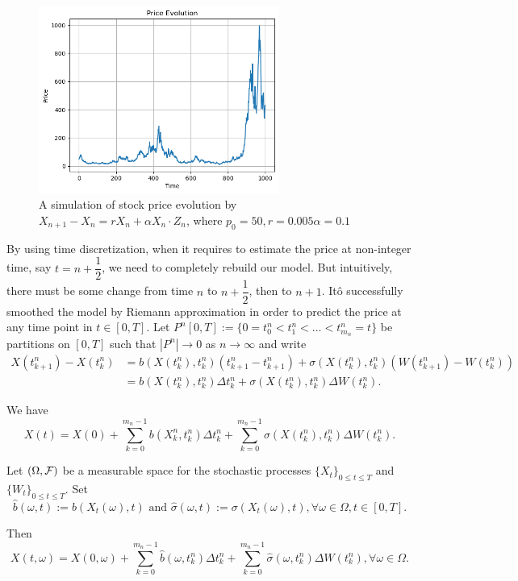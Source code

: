 \begin{figure}
  \centering
  \includegraphics[width=0.7\textwidth]{img/stock-price-sampling.png}
  \vspace{0.25cm}
  \caption[Stock price simulation]{A simulation of stock price evolution by $X_{n+1} - X_n = rX_n + \alpha X_n\cdot Z_{n}$, where $p_0=50, r = 0.005
      \alpha = 0.1$}
\end{figure}

By using time discretization, when it requires to estimate the price at non-integer time, say $t=n+\dfrac{1}{2}$, we need to completely rebuild our model. But intuitively, there must be some change from time $n$ to $n+\dfrac{1}{2}$, then to $n+1$. Itô successfully smoothed the model by Riemann approximation in order to predict the price at any time point in $t\in[0,T]$. Let $P^n[0,T]:=\{0=t^n_0<t^n_1<\ldots<t^n_{m_n}=t\}$ be partitions on $[0,T]$ such that $|P^n|\to 0$ as $n\to\infty$ and write
\begin{align*}
  X(t^n_{k+1})- X(t^n_{k})
   & = b(X(t^n_{k}),t^n_{k})(t^n_{k+1} - t^n_{k+1})+ \sigma(X(t^n_{k}),t^n_{k})(W(t^n_{k+1})-W(t^n_{k})) \\
   & = b(X(t^n_{k}),t^n_{k})\Delta t^n_{k} + \sigma(X(t^n_{k}),t^n_{k})\Delta W(t^n_{k}).
\end{align*}

We have
$$X(t)=X(0)+\sum\limits_{k=0}^{m_n-1}  b(X_k^n,t_k^n)\Delta t^n_{k} + \sum\limits_{k=0}^{m_n-1} \sigma(X(t^n_{k}),t^n_{k})\Delta W(t^n_{k}).$$

Let $(\Omega, \mathcal{F})$ be a measurable space for the stochastic processes $\{X_t\}_{0\le t\le T}$ and $\{W_t\}_{0\le t\le T}$. Set
$$\hat{b}(\omega, t) :=  b(X_t(\omega),t) \text{ and } \hat{\sigma}(\omega, t) := \sigma(X_t(\omega),t), \forall \omega\in\Omega, t\in[0,T].$$

Then
\begin{equation}
  \label{equation:stochastic-sum}
  X(t,\omega)=X(0,\omega)+\sum\limits_{k=0}^{m_n-1}  \hat{b}(\omega, t_k^n)\Delta t^n_{k} + \sum\limits_{k=0}^{m_n-1} \hat{\sigma}(\omega, t_k^n)\Delta W(t^n_{k}), \forall \omega\in\Omega.
\end{equation}

